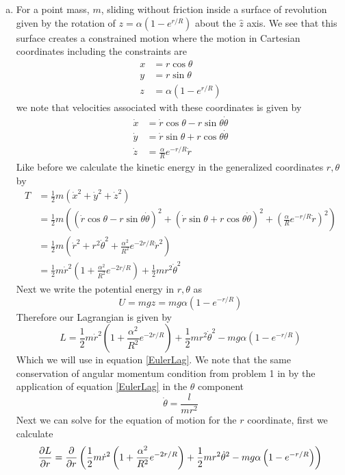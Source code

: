\documentclass[11pt]{article}
\numberwithin{equation}{section}
\begin{document}
\begin{enumerate}[(a)]
\item For a point mass, $m$, sliding without friction inside a surface of revolution given 
by the rotation of $z=\alpha\left(1-e^{r/R}\right)$ about the $\hat{z}$ axis. We see that this surface
creates a constrained motion where the motion in Cartesian coordinates including the 
constraints are
\begin{align*} 
x &= r\cos\theta\\
y &= r\sin\theta\\
z &= \alpha\left(1-e^{r/R}\right)
\end{align*} 
we note that velocities associated with these coordinates is given by
\begin{align*}
\dot{x} &= \dot{r}\cos\theta-r\sin\theta\dot\theta\\
\dot{y} &= \dot{r}\sin\theta+r\cos\theta\dot\theta\\
\dot{z} &= \frac{\alpha}{R}e^{-r/R}\dot{r}
\end{align*}
Like before we calculate the kinetic energy in the generalized coordinates $r,\theta$ by
\begin{align*}
T &= \frac{1}{2}m\left(\dot{x}^2 + \dot{y}^2 + \dot{z}^2\right)\\
&= \frac{1}{2}m\left((\dot{r}\cos\theta-r\sin\theta\dot\theta)^2 + (\dot{r}\sin\theta+r\cos\theta\dot\theta)^2 + \left(\frac{\alpha}{R}e^{-r/R}\dot{r}\right)^2\right)\\
&= \frac{1}{2}m\left(\dot{r}^2 + r^2\dot{\theta}^2 + \frac{\alpha^2}{R^2}e^{-2r/R}\dot{r}^2\right)\\
&= \frac{1}{2}m\dot{r}^2 \left(1 + \frac{\alpha^2}{R^2}e^{-2r/R}\right) + \frac{1}{2}mr^2\dot{\theta}^2 
\end{align*}
Next we write the potential energy in $r,\theta$ as
$$U = mgz = mg\alpha\left(1-e^{-r/R}\right)$$
Therefore our Lagrangian is given by
$$L =\frac{1}{2}m\dot{r}^2 \left(1 + \frac{\alpha^2}{R^2}e^{-2r/R}\right) + \frac{1}{2}mr^2\dot{\theta}^2 - mg\alpha\left(1-e^{-r/R}\right)$$
Which we will use in equation \ref{EulerLag}. We note that the same conservation of angular
momentum condition from problem 1 in by the application of equation \ref{EulerLag} in the 
$\theta$ component
$$\dot{\theta} = \frac{l}{mr^2}$$
Next we can solve for the equation of motion for the $r$ coordinate, first we calculate
\begin{align*}
\partiald{L}{r} &= \partiald{}{r}\left(\frac{1}{2}m\dot{r}^2 \left(1 + \frac{\alpha^2}{R^2}e^{-2r/R}\right) + \frac{1}{2}mr^2\dot{\theta}^2 - mg\alpha\left(1-e^{-r/R}\right)\right)\\

\end{align*}
\end{enumerate}
\end{document}
